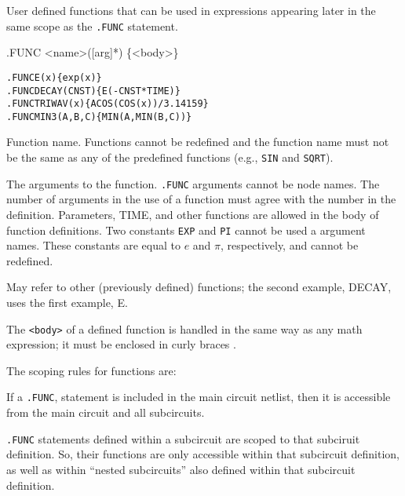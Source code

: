 


User defined functions that can be used in expressions appearing later
in the same scope as the \texttt{.FUNC} statement.

\begin{Command}
\format
.FUNC <name>([arg]*) \{<body>\}

\examples
\begin{alltt}
.FUNC E(x) \{exp(x)\}
.FUNC DECAY(CNST) \{E(-CNST*TIME)\}
.FUNC TRIWAV(x) \{ACOS(COS(x))/3.14159\}
.FUNC MIN3(A,B,C) \{MIN(A,MIN(B,C))\}
\end{alltt}

\arguments

\begin{Arguments}

Function name.  Functions cannot be redefined and the function name must 
not be the same as any of the
predefined functions (e.g., \texttt{SIN} and \texttt{SQRT}).  


The arguments to the function.  \texttt{.FUNC} arguments cannot be node names.
The number of arguments in the use of a function must agree with the number 
in the definition. Parameters, TIME, and other functions are allowed in 
the body of function definitions.  
Two constants \texttt{EXP} and \texttt{PI} cannot
be used a argument names.  These constants are equal to $e$ and $\pi$, respectively,
and cannot be redefined.


May refer to other (previously defined) functions; the second example, 
DECAY, uses the first example, E. 

\end{Arguments}

\comments

The \texttt{<body>} of a defined function is handled in the same way as any 
math expression; it must be enclosed in curly braces {}.

The scoping rules for functions are:
\begin{XyceItemize}
\item If a \texttt{.FUNC}, statement is included in the main circuit 
netlist, then it is accessible from the main circuit and all subcircuits. 
\item \texttt{.FUNC} statements defined within a subcircuit are scoped 
to that subciruit definition.  So, their functions are only accessible within 
that subcircuit definition, as well as within ``nested subcircuits'' also 
defined within that subcircuit definition.
\end{XyceItemize}


\end{Command}
